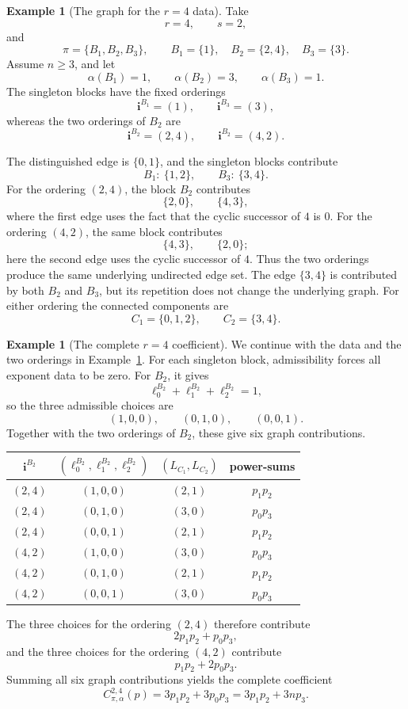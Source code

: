 \documentclass[11pt,reqno]{amsart}
\theoremstyle{definition}
\newtheorem{example}[theorem]{Example}
\newcommand{\bfi}{\mathbf{i}}
\begin{document}
\begin{example}[The graph for the \(r=4\) data]
\label{Appexample:r=4}
Take
\[
   r=4,\qquad s=2,
\]
and
\[
   \pi=\{B_1,B_2,B_3\},
   \qquad
   B_1=\{1\},\quad
   B_2=\{2,4\},\quad
   B_3=\{3\}.
\]
Assume \(n\geq3\), and let
\[
   \alpha(B_1)=1,\qquad
   \alpha(B_2)=3,\qquad
   \alpha(B_3)=1.
\]
The singleton blocks have the fixed orderings
\[
   \bfi^{B_1}=(1),
   \qquad
   \bfi^{B_3}=(3),
\]
whereas the two orderings of \(B_2\) are
\[
   \bfi^{B_2}=(2,4),
   \qquad
   \bfi^{B_2}=(4,2).
\]

The distinguished edge is \(\{0,1\}\), and the singleton blocks contribute
\[
   B_1:\ \{1,2\},
   \qquad
   B_3:\ \{3,4\}.
\]
For the ordering \((2,4)\), the block \(B_2\) contributes
\[
   \{2,0\},
   \qquad
   \{4,3\},
\]
where the first edge uses the fact that the cyclic successor of \(4\) is
\(0\).  For the ordering \((4,2)\), the same block contributes
\[
   \{4,3\},
   \qquad
   \{2,0\};
\]
here the second edge uses the cyclic successor of \(4\).
Thus the two orderings produce the same underlying undirected edge set.
The edge \(\{3,4\}\) is contributed by both \(B_2\) and \(B_3\), but its
repetition does not change the underlying graph.  For either ordering the
connected components are
\[
   C_1=\{0,1,2\},
   \qquad
   C_2=\{3,4\}.
\]
\end{example}

\begin{example}[The complete \(r=4\) coefficient]
\label{Appexample:r=4contd}
We continue with the data and the two orderings in
Example~\ref{Appexample:r=4}.  For each singleton block, admissibility
forces all exponent data to be zero.  For \(B_2\), it gives
\[
   \ell_0^{B_2}+\ell_1^{B_2}+\ell_2^{B_2}=1,
\]
so the three admissible choices are
\[
   (1,0,0),\qquad
   (0,1,0),\qquad
   (0,0,1).
\]
Together with the two orderings of \(B_2\), these give six graph
contributions.
\begin{center}
\small
\renewcommand{\arraystretch}{1.2}
\begin{tabular}{c|c|c|c}
\(\bfi^{B_2}\) &
\((\ell_0^{B_2},\ell_1^{B_2},\ell_2^{B_2})\) &
\((L_{C_1},L_{C_2})\) &
power-sums \\
\hline
\((2,4)\) & \((1,0,0)\)  & \((2,1)\) & \(p_1p_2\) \\
\((2,4)\) & \((0,1,0)\)  & \((3,0)\) & \(p_0p_3\) \\
\((2,4)\) & \((0,0,1)\)  & \((2,1)\) & \(p_1p_2\) \\
\((4,2)\) & \((1,0,0)\)  & \((3,0)\) & \(p_0p_3\) \\
\((4,2)\) & \((0,1,0)\)  & \((2,1)\) & \(p_1p_2\) \\
\((4,2)\) & \((0,0,1)\)  & \((3,0)\) & \(p_0p_3\)
\end{tabular}
\end{center}
The three choices for the ordering \((2,4)\) therefore contribute
\[
   2p_1p_2+p_0p_3,
\]
and the three choices for the ordering \((4,2)\) contribute
\[
   p_1p_2+2p_0p_3.
\]
Summing all six graph contributions yields the complete coefficient
\[
   C_{\pi,\alpha}^{2,4}(p)
   =
   3p_1p_2+3p_0p_3
   =
   3p_1p_2+3np_3.
\]
\end{example}







\end{document}
